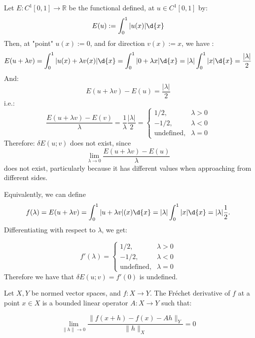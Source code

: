 \documentclass{article}
\begin{document}
\begin{example} Let $E: C^{1}[0,1] \to \mathbb{R}$ be the functional defined, at $u \in C^{1}[0,1]$ by:
\[
  E(u) := \int_{0}^{1} |u(x)| \d{x}
\]
  Then, at "point" $u(x) := 0$, and for direction $v(x) := x$, we have :
\[
  E(u+\lambda v) = \int_{0}^{1} |u(x) + \lambda v(x)| \d{x} = \int_{0}^{1} |0 + \lambda x| \d{x} = | \lambda | \int_{0}^{1} |x| \d{x} = \frac{ | \lambda| }{2}
\]
And:
\[
  E(u+\lambda v) - E(u) = \frac{ | \lambda| }{2}
\]
i.e.:
\[
  \frac{E (u + \lambda v) - E(v) }{\lambda} =   \frac{1}{\lambda} \frac{| \lambda |}{2} = \begin{cases} 1/2, & \lambda > 0 \\ -1/2, & \lambda < 0 \\ \text{undefined}, & \lambda = 0 \end{cases} 
\]
Therefore:
$\delta E(u ; v)$ does not exist, since 
 \[
   \lim_{\lambda \to 0} \frac{E(u + \lambda v)-E(u)}{ \lambda} 
 \]
  does not exist, particularly because it has different values when   approaching from different sides. 

Equivalently, we can define
\[
  f (\lambda) = E(u + \lambda v) = \int_{0}^{1} | u + \lambda v |(x)  \d{x} = | \lambda |
  \int_{0}^{1} | x | \d{x} = | \lambda | \frac{1}{2}. 
\] 
Differentiating with respect to $\lambda$, we get:

\[
  f'(\lambda) =  \begin{cases} 1/2, & \lambda >0 \\ -1/2,  & \lambda < 0 \\ \text{undefined}, & \lambda = 0  \end{cases} 
\]
  Therefore we have that $\delta E (u ; v) = f'(0)$ is undefined. 
\end{example}



\begin{definition} Let $X,Y$ be normed vector spaces, and $f: X \to Y$.   The Fréchet derivative of $f$ at a point $x \in X$ is a bounded linear operator $A: X \to Y$ such that:

\[
  \lim_{\lVert h \rVert \to 0} \frac{ \lVert f(x+h) - f(x) - Ah \rVert_Y  }{ \lVert h \rVert_X  } = 0
\]
 \end{definition}
\end{document}
